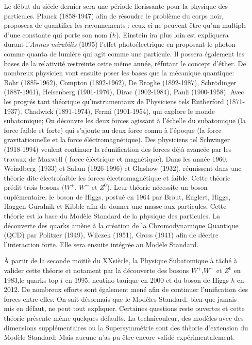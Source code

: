 Le début du siécle dernier sera une période florissante pour la physique des particules. Planck (1858-1947) afin de résoudre le problème du corps noir, proposera de quantifier les rayonnements : ceux-ci ne peuvent être qu'un multiple d'une constante qui porte son nom ($h$). Einstein ira plus loin est expliquera durant l'\textit{Annus mirabilis} (1095) l'effet photoélectrique en proposant le photon comme quanta de lumière qui agit comme une particule. Il possera également les bases de la relativité restreinte cette même année, réfutant le concept d'éther. De nombreux physicien vont ensuite poser les bases que la mécanique quantique: Bohr (1885-1962), Compton (1892-1962), De Broglie (1892-1987), Schrödinger (1887-1961), Heisenberg (1901-1976), Dirac (1902-1984), Pauli (1900-1958). Avec les progrés tant théorique qu'instrumentaux de Physiciens tels  Rutherford (1871-1937), Chadwick (1891-1974), Fermi (1901-1954), qui explore le monde subatomique; On découvre les deux forces agissant à l'échelle du subatomique (la force faible et forte) qui s'ajoute au deux force connu à l'époque (la force gravitationnelle et la force éléctromagnétique). Des physiciens tel Schwinger (1918-1994) veulent continuer la réunification des forces déjà avancée par les travaux de Maxwell ( force éléctrique et magnétique). Dans les année 1960, Weindberg (1933) et Salam (1926-1996) et Glashow (1932), réunissent dans une théorie dite électrofaible les forces électromagnétique et faible. Cette théorie prédit trois bosons ($W^{+}$, $W^{-}$ et $Z^{0}$). Leur théorie nécessite un boson suplémentaire, le boson de Higgs, postué en 1964 par Brout, Englert, Higgs, Haggen Guralnik et Kibble afin de donner une masse aux particules. Cette théorie est la base du Modèle Standard de la physique des particules. La découverte des quarks amène à la création de la Chromodynamique Quantique (QCD) par Politzer (1949), Wilczek (1951), Gross (1941) afin de décrire l'interaction forte. Elle sera ensuite intégrée au Modèle Standard.

À partir de la seconde moitiè du XX\ieme siècle, la Physique Subatomique à tâché à valider cette théorie et notament par la découverte des bosons  $W^{+}$,$W^{-}$ et $Z^{0}$ en 1983,le quarks top $t$ en 1995, neutino tauique en 2000 et du boson de Higgs $h$ en 2012. De nombreux efforts sont également mené afin de continuer l'unification des forces entre elles. On sait désormais que le Modèles Standard, bien que jamais mis en défaut, ne peut tout expliquer. Certaines questions reste ouvertes et cette théorie présente même quelques défaults. La technicouleur, des modèles avec des dimensions supplémentaires ou la Supersymmètrie sont des thèorie d'extension du Modèle Standard; Mais aucune n'as pu être encore validé expérimentalement.

